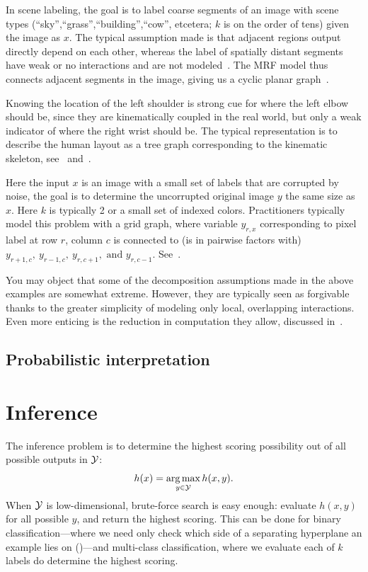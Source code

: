  In scene labeling, the goal is to label coarse segments 
of an image with scene types (``sky'',``grass'',``building'',``cow'', etcetera; 
$k$ is on the order of tens) given the image as $x$. The typical assumption 
made is that adjacent regions output directly depend on each other, whereas the 
label of spatially distant segments have weak or no interactions and are not 
modeled~\citep{cour05}.  The MRF model thus connects adjacent segments in the 
image, giving us a cyclic planar graph~.

  Knowing the location of the left shoulder is 
strong cue for where the left elbow should be, since they are kinematically 
coupled in the real world, but only a weak indicator of where the right wrist 
should be.  The typical representation is to describe the human layout as a 
tree graph corresponding to the kinematic skeleton, 
see~ and~.


 Here the input $x$ is an image with a small set of 
labels that are corrupted by noise, the goal is to determine the uncorrupted 
original image $y$ the same size as $x$.  Here $k$ is typically 2 or a small 
set of indexed colors. Practitioners typically model this problem with a grid 
graph, where variable $y_{r,x}$ corresponding to pixel label at row $r$, column 
$c$ is connected to (is in pairwise factors with) 
$y_{r+1,c},~y_{r-1,c},~y_{r,c+1}, \text{ and } y_{r,c-1}$.  
See~.

You may object that some of the decomposition assumptions made in the above 
examples are somewhat extreme.  However, they are typically seen as forgivable 
thanks to the greater simplicity of modeling only local, overlapping 
interactions. Even more enticing is the reduction in computation they allow, 
discussed in~.

\subsection{Probabilistic interpretation}\label{sec:probinterp}

\section{Inference}
\label{sec:inference}
The inference problem is to determine the highest scoring possibility out of 
all possible outputs in $\mathcal{Y}$: \begin{equation} h(x) = \mathop{\arg\max}_{y \in \mathcal{Y}} 
h(x,y).  \end{equation}  When $\mathcal{Y}$ is low-dimensional, brute-force search is 
easy enough: evaluate $h(x,y)$ for all possible $y$, and return the highest 
scoring.  This can be done for binary classification---where we need only check 
which side of a separating hyperplane an example lies on 
()---and multi-class classification, where we 
evaluate each of $k$ labels do determine the highest scoring.


